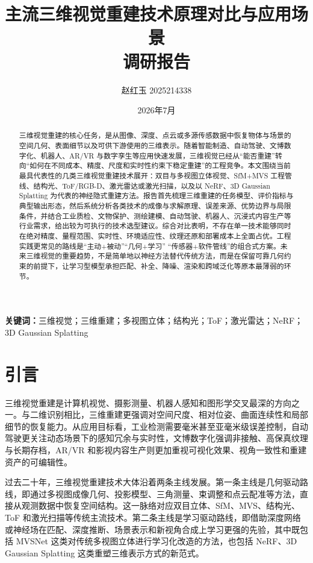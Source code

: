 \documentclass[12pt,a4paper]{ctexart}
\title{\textbf{主流三维视觉重建技术原理对比与应用场景\\调研报告}}
\author{赵红玉	2025214338}
\date{2026年7月}
\begin{document}
\maketitle
\tableofcontents
\newpage

\begin{abstract}
三维视觉重建的核心任务，是从图像、深度、点云或多源传感数据中恢复物体与场景的空间几何、表面细节以及可供下游使用的三维表示。随着智能制造、自动驾驶、文博数字化、机器人、AR/VR 与数字孪生等应用快速发展，三维视觉已经从“能否重建”转向“如何在不同成本、精度、尺度和实时性约束下稳定重建”的工程竞争。本文围绕当前最具代表性的几类三维视觉重建技术展开：双目与多视图立体视觉、SfM+MVS 工程管线、结构光、ToF/RGB-D、激光雷达或激光扫描，以及以 NeRF、3D Gaussian Splatting 为代表的神经隐式重建方法。报告首先梳理三维重建的任务模型、评价指标与典型输出形态，然后系统分析各类技术的成像与求解原理、误差来源、优势边界与局限条件，并结合工业质检、文物保护、测绘建模、自动驾驶、机器人、沉浸式内容生产等行业需求，给出较为可执行的技术选型建议。综合对比表明，不存在单一技术能够同时在绝对精度、量程范围、实时性、环境适应性、纹理还原和部署成本上全面占优。工程实践更常见的路线是“主动+被动”\hspace{0.2em}“几何+学习” \hspace{0.2em}“传感器+软件管线”的组合式方案。未来三维视觉的重要趋势，不是简单地以神经方法替代传统方法，而是在保留可靠几何约束的前提下，让学习型模型承担匹配、补全、降噪、渲染和跨域泛化等原本最薄弱的环节。
\end{abstract}

\noindent\textbf{关键词：}三维视觉；三维重建；多视图立体；结构光；ToF；激光雷达；NeRF；3D Gaussian Splatting

\section{引言}

三维视觉重建是计算机视觉、摄影测量、机器人感知和图形学交叉最深的方向之一。与二维识别相比，三维重建更强调对空间尺度、相对位姿、曲面连续性和局部细节的恢复能力。从应用目标看，工业检测需要毫米甚至亚毫米级误差控制，自动驾驶更关注动态场景下的感知冗余与实时性，文博数字化强调非接触、高保真纹理与长期存档，AR/VR 和影视内容生产则更加重视可视化效果、视角一致性和重建资产的可编辑性。\cite{seitz2006,schoeps2017eth3d,mildenhall2020nerf,kerbl2023gaussian}

过去二十年，三维视觉重建技术大体沿着两条主线发展。第一条主线是几何驱动路线，即通过多视图成像几何、投影模型、三角测量、束调整和点云配准等方法，直接从观测数据中恢复空间结构。这一脉络对应双目立体、SfM、MVS、结构光、ToF 和激光扫描等传统主流技术。第二条主线是学习驱动路线，即借助深度网络或神经场在匹配、深度推断、场景表示和新视角合成上学习更强的先验，其中既包括 MVSNet 这类对传统多视图立体进行学习化改造的方法，也包括 NeRF、3D Gaussian Splatting 这类重塑三维表示方式的新范式。\cite{scharstein2003,schonberger2016sfm,schonberger2016mvs,yao2018mvsnet,mildenhall2020nerf,kerbl2023gaussian}
\end{document}
